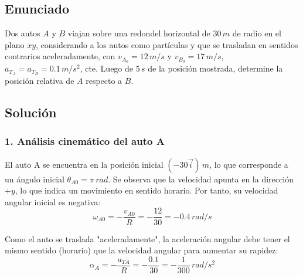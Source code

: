 \documentclass[12pt, a4paper]{article}
\begin{document}
\newpage

\subsection*{Enunciado}
Dos autos $A$ y $B$ viajan sobre una redondel horizontal de $30 \, \si{m}$ de radio en el plano $xy$, considerando a los autos como partículas y que se trasladan en sentidos contrarios aceleradamente, con $v_{A_0} = 12 \, \si{m/s}$ y $v_{B_0} = 17 \, \si{m/s}$, $a_{T_A} = a_{T_B} = 0.1 \, \si{m/s^2}$, cte. Luego de $5 \, \si{s}$ de la posición mostrada, determine la posición relativa de $A$ respecto a $B$. 

\begin{center}
\end{center}

\subsection*{Solución}

\subsubsection*{1. Análisis cinemático del auto A}
El auto A se encuentra en la posición inicial $(-30\vec{i}) \, \si{m}$, lo que corresponde a un ángulo inicial $\theta_{A0} = \pi \, \si{rad}$.
Se observa que la velocidad apunta en la dirección $+y$, lo que indica un movimiento en sentido horario. Por tanto, su velocidad angular inicial es negativa:
$$ \omega_{A0} = -\frac{v_{A0}}{R} = -\frac{12}{30} = -0.4 \, \si{rad/s} $$

Como el auto se traslada "aceleradamente", la aceleración angular debe tener el mismo sentido (horario) que la velocidad angular para aumentar su rapidez:
$$ \alpha_A = -\frac{a_{TA}}{R} = -\frac{0.1}{30} = -\frac{1}{300} \, \si{rad/s^2} $$
\end{document}
